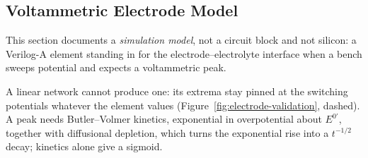 
\subsection{Voltammetric Electrode Model}\label{ss:analog-electrode-bc}

This section documents a \emph{simulation model}, not a circuit block and not
silicon: a Verilog-A element standing in for the electrode--electrolyte
interface when a bench sweeps potential and expects a voltammetric peak.

A linear network cannot produce one: its extrema stay pinned at the switching
potentials whatever the element values (Figure~\ref{fig:electrode-validation},
dashed). A peak needs Butler--Volmer kinetics, exponential in overpotential
about \(E^{0\prime}\), together with diffusional depletion, which turns the
exponential rise into a \(t^{-1/2}\) decay; kinetics alone give a sigmoid.

